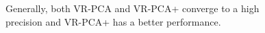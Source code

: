 \documentclass[runningheads,a4paper]{llncs}
\begin{document}
\begin{figure}[ht]
\centering

\caption{Generally, both VR-PCA and VR-PCA+ converge to a high precision and VR-PCA+ has a better performance.}
\label{pca}
\end{figure}
 
\end{document}
